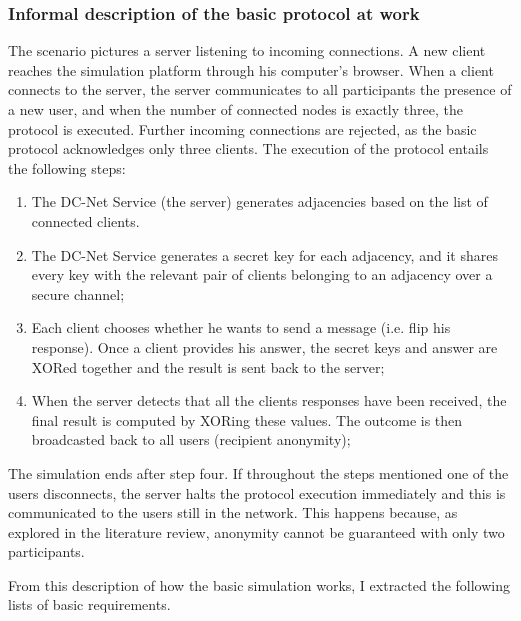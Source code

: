 \subsubsection{Informal description of the basic protocol at work}
The scenario pictures a server listening to incoming connections. A new client reaches the simulation platform through his computer's browser. When a client connects to the server, the server communicates to all participants the presence of a new user, and when the number of connected nodes is exactly three, the protocol is executed. Further incoming connections are rejected, as the basic protocol acknowledges only three clients. The execution of the protocol entails the following steps:
\begin{enumerate}
    \item The DC-Net Service (the server) generates adjacencies based on the list of connected clients.
    \item The DC-Net Service generates a secret key for each adjacency, and it shares every key with the relevant pair of clients belonging to an adjacency over a secure channel;
    \item Each client chooses whether he wants to send a message (i.e. flip his response). Once a client provides his answer, the secret keys and answer are XORed together and the result is sent back to the server;
    \item When the server detects that all the clients responses have been received, the final result is computed by XORing these values. The outcome is then broadcasted back to all users (recipient anonymity);
\end{enumerate}

The simulation ends after step four. If throughout the steps mentioned one of the users disconnects, the server halts the protocol execution immediately and this is communicated to the users still in the network. This happens because, as explored in the literature review, anonymity cannot be guaranteed with only two participants.

From this description of how the basic simulation works, I extracted the following lists of basic requirements.

